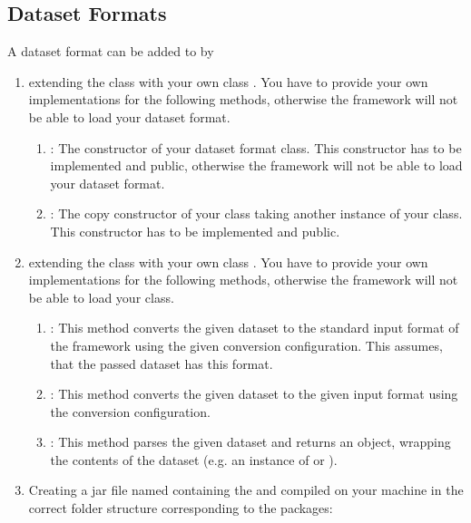 	\subsection{Dataset Formats}\label{subsec_extend_datasetformats}
	A dataset format  can be added to \clusteval by
	\begin{enumerate}
		\item extending the class  with your own class . You have to provide your own implementations for the following methods, otherwise the framework will not be able to load your dataset format.
		\begin{enumerate}
			\item {}: The constructor of your dataset format class. This constructor has to be implemented and public, otherwise the framework will not be able to load your dataset format.
			\item {}: The copy constructor of your class taking another instance of your class. This constructor has to be implemented and public.
		\end{enumerate}
		\item extending the class  with your own class . You have to provide your own implementations for the following methods, otherwise the framework will not be able to load your class.
		\begin{enumerate}
			\item {}: This method converts the given dataset to the standard input format of the framework using the given conversion configuration. This assumes, that the passed dataset has this format.
			\item {}: This method converts the given dataset to the given input format using the conversion configuration.
			\item {}:  This method parses the given dataset and returns an object, wrapping the contents of the dataset (e.g. an instance of  or ).
		\end{enumerate}
			\item Creating a jar file named  containing the  and  compiled on your machine in the correct folder structure corresponding to the packages:
			

\end{enumerate}
